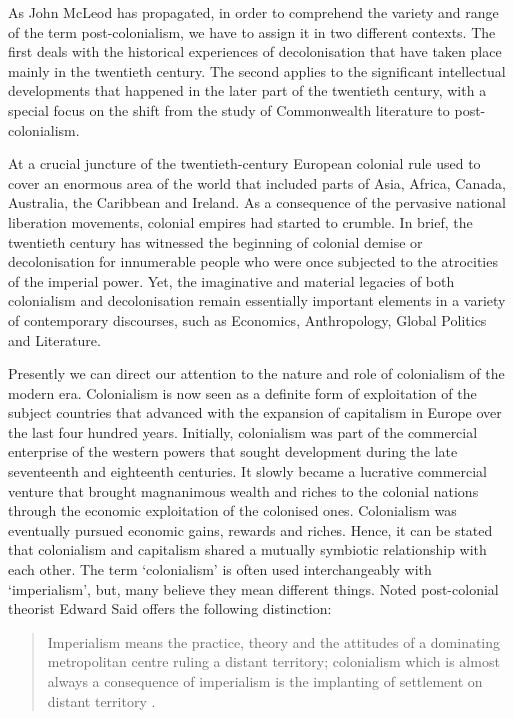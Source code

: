 As John McLeod has propagated, in order to comprehend the variety and range of the term post-colonialism, we have to assign it in two different contexts. The first deals with the historical experiences of decolonisation that have taken place mainly in the twentieth century. The second applies to the significant intellectual developments that happened in the later part of the twentieth century, with a special focus on the shift from the study of Commonwealth literature to post-colonialism. 

At a crucial juncture of the twentieth-century European colonial rule used to cover an enormous area of the world that included parts of Asia, Africa, Canada, Australia, the Caribbean and Ireland. As a consequence of the pervasive national liberation movements, colonial empires had started to crumble. In brief, the twentieth century has witnessed the beginning of colonial demise or decolonisation for innumerable people who were once subjected to the atrocities of the imperial power. Yet, the imaginative and material legacies of both colonialism and decolonisation remain essentially important elements in a variety of contemporary discourses, such as Economics, Anthropology, Global Politics and Literature. 

Presently we can direct our attention to the nature and role of colonialism of the modern era. Colonialism is now seen as a definite form of exploitation of the subject countries that advanced with the expansion of capitalism in Europe over the last four hundred years. Initially, colonialism was part of the commercial enterprise of the western powers that sought development during the late seventeenth and eighteenth centuries. It slowly became a lucrative commercial venture that brought magnanimous wealth and riches to the colonial nations through the economic exploitation of the colonised ones. Colonialism was eventually pursued economic gains, rewards and riches. Hence, it can be stated that colonialism and capitalism shared a mutually symbiotic relationship with each other. The term ‘colonialism’ is often used interchangeably with ‘imperialism’, but, many believe they mean different things. Noted post-colonial theorist Edward Said offers the following distinction: 

\begin{quote}
 Imperialism means the practice, theory and the attitudes of a dominating metropolitan centre ruling a distant territory; colonialism which is almost always a consequence of imperialism is the implanting of settlement on distant territory \parencite{Said1993}.
\end{quote}

